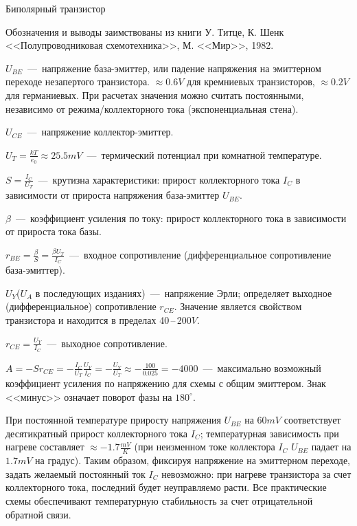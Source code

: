 \documentclass[
a4paper
,11pt
,landscape
,russian
,twocolumn
]{letter}
\begin{document}
\thispagestyle{empty}

\begin{Large}
Биполярный транзистор
\end{Large}

Обозначения и выводы заимствованы из книги У. Титце, К. Шенк
<<Полупроводниковая схемотехника>>, М. <<Мир>>, 1982.

$U_{BE}$~---~напряжение база-эмиттер, или падение напряжения на
эмиттерном переходе незапертого транзистора. $\approx 0.6V$ для
кремниевых транзисторов, $\approx 0.2V$ для германиевых. При расчетах
значения можно считать постоянными, независимо от режима/коллекторного
тока (экспоненциальная стена).

$U_{CE}$~---~напряжение коллектор-эмиттер.

$U_T=\frac{kT}{e_0}\approx 25.5mV$~---~термический потенциал при
комнатной температуре.

$S=\frac{I_C}{U_T}$~---~крутизна характеристики: прирост коллекторного
тока $I_C$ в зависимости от прироста напряжения база-эмиттер $U_{BE}$.

$\beta$~---~коэффициент усиления по току: прирост
коллекторного тока в зависимости от прироста тока базы.

$r_{BE}=\frac{\beta}{S}=\frac{\beta U_T}{I_C}$~---~входное сопротивление
(дифференциальное сопротивление база-эмиттер).

$U_Y$($U_A$ в последующих изданиях)~---~напряжение Эрли; определяет
выходное (дифференциальное) сопротивление $r_{CE}$. Значение является
свойством транзистора и находится в пределах 40\,--\,200$V$.

$r_{CE}=\frac{U_Y}{I_C}$~---~выходное сопротивление.

$A=-Sr_{CE}=-\frac{I_C}{U_T}\frac{U_Y}{I_C}=-\frac{U_Y}{U_T}
\approx-\frac{100}{0.025}=-4000$~---~максимально возможный
коэффициент усиления по напряжению для схемы с общим эмиттером.
Знак <<минус>> означает поворот фазы на $180^{\circ}$.

\vspace{.2in}

При постоянной температуре приросту напряжения $U_{BE}$ на $60mV$
соответствует десятикратный прирост коллекторного тока $I_C$;
температурная зависимость при нагреве составляет
$\approx -1.7\frac{mV}{K}$
(при неизменном токе коллектора $I_C$ $U_{BE}$ падает на
$1.7mV$ на градус). Таким образом, фиксируя напряжение на
эмиттерном переходе, задать желаемый постоянный ток $I_C$
невозможно: при нагреве транзистора за счет коллекторного
тока, последний будет неуправляемо расти. Все практические
схемы обеспечивают температурную стабильность за счет
отрицательной обратной связи.
\end{document}
